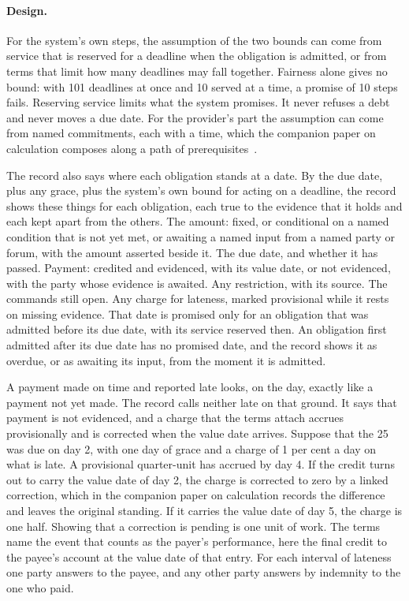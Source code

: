\documentclass{momentum}
\begin{document}
\paragraph{Design.} For the system's own steps, the assumption of the two bounds can come from service that is reserved for a deadline when the obligation is admitted, or from terms that limit how many deadlines may fall together. Fairness alone gives no bound: with 101 deadlines at once and 10 served at a time, a promise of 10 steps fails. Reserving service limits what the system promises. It never refuses a debt and never moves a due date. For the provider's part the assumption can come from named commitments, each with a time, which the companion paper on calculation composes along a path of prerequisites~\cite[Section~6]{claim}.

The record also says where each obligation stands at a date. By the due date, plus any grace, plus the system's own bound for acting on a deadline, the record shows these things for each obligation, each true to the evidence that it holds and each kept apart from the others. The amount: fixed, or conditional on a named condition that is not yet met, or awaiting a named input from a named party or forum, with the amount asserted beside it. The due date, and whether it has passed. Payment: credited and evidenced, with its value date, or not evidenced, with the party whose evidence is awaited. Any restriction, with its source. The commands still open. Any charge for lateness, marked provisional while it rests on missing evidence. That date is promised only for an obligation that was admitted before its due date, with its service reserved then. An obligation first admitted after its due date has no promised date, and the record shows it as overdue, or as awaiting its input, from the moment it is admitted.

A payment made on time and reported late looks, on the day, exactly like a payment not yet made. The record calls neither late on that ground. It says that payment is not evidenced, and a charge that the terms attach accrues provisionally and is corrected when the value date arrives. Suppose that the 25 was due on day 2, with one day of grace and a charge of 1 per cent a day on what is late. A provisional quarter-unit has accrued by day 4. If the credit turns out to carry the value date of day 2, the charge is corrected to zero by a linked correction, which in the companion paper on calculation records the difference and leaves the original standing. If it carries the value date of day 5, the charge is one half. Showing that a correction is pending is one unit of work. The terms name the event that counts as the payer's performance, here the final credit to the payee's account at the value date of that entry. For each interval of lateness one party answers to the payee, and any other party answers by indemnity to the one who paid.
\end{document}
